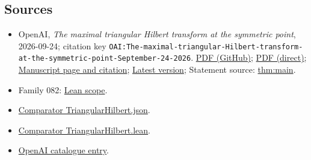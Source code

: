 \documentclass[11pt]{article}
\begin{document}
\subsection{Sources}
\begin{itemize}
\item OpenAI, \emph{The maximal triangular Hilbert transform at the symmetric point}, 2026-09-24; citation key \texttt{OAI:The-maximal-triangular-Hilbert-transform-at-the-symmetric-point-September-24-2026}. \href{https://github.com/openai/math/blob/adc7f1241b42e322a6451854ab7e4b4c146bf78a/preprints/The-maximal-triangular-Hilbert-transform-at-the-symmetric-point-September-24-2026/paper.pdf}{PDF (GitHub)}; \href{https://github.com/openai/math/raw/adc7f1241b42e322a6451854ab7e4b4c146bf78a/preprints/The-maximal-triangular-Hilbert-transform-at-the-symmetric-point-September-24-2026/paper.pdf}{PDF (direct)}; \href{https://github.com/openai/math/blob/adc7f1241b42e322a6451854ab7e4b4c146bf78a/preprints/The-maximal-triangular-Hilbert-transform-at-the-symmetric-point-September-24-2026/README.md}{Manuscript page and citation}; \href{https://github.com/openai/math/blob/main/preprints/The-maximal-triangular-Hilbert-transform-at-the-symmetric-point-September-24-2026/paper.pdf}{Latest version}; Statement source: \href{https://github.com/openai/math/blob/adc7f1241b42e322a6451854ab7e4b4c146bf78a/preprints/The-maximal-triangular-Hilbert-transform-at-the-symmetric-point-September-24-2026/build/sections/introduction.tex\#L16}{thm:main}.
\item Family 082: \href{https://github.com/openai/math/blob/adc7f1241b42e322a6451854ab7e4b4c146bf78a/lean/docs/082.md}{Lean scope}.
\item \href{https://github.com/openai/math/blob/adc7f1241b42e322a6451854ab7e4b4c146bf78a/lean/ComparatorChallenges/TriangularHilbert.json}{Comparator TriangularHilbert.json}.
\item \href{https://github.com/openai/math/blob/adc7f1241b42e322a6451854ab7e4b4c146bf78a/lean/ComparatorChallenges/TriangularHilbert.lean}{Comparator TriangularHilbert.lean}.
\item \href{https://github.com/openai/math/blob/adc7f1241b42e322a6451854ab7e4b4c146bf78a/CONTENTS.md}{OpenAI catalogue entry}.
\end{itemize}
\end{document}
